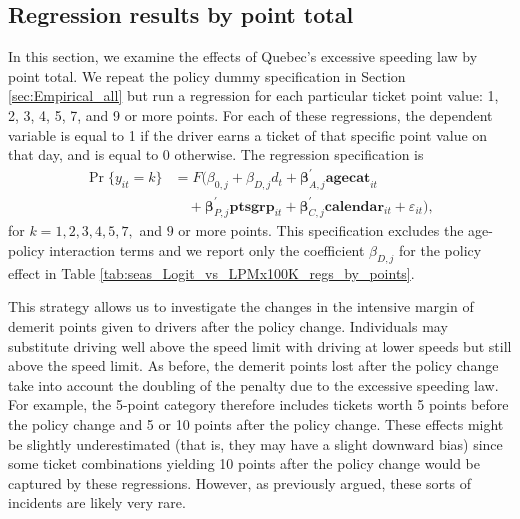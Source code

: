 \subsection{Regression results by point total}
\label{sec:Empirical_by_pts}

In this section, we examine the effects of Quebec’s excessive speeding law by point total. 
We repeat the policy dummy specification in 
Section \ref{sec:Empirical_all} 
but run a regression for each particular ticket point value: 1, 2, 3, 4, 5, 7, and 9 or more points. 
For each of these regressions, the dependent variable is equal to 1 
if the driver earns a ticket of that specific point value on that day, and is equal to 0 otherwise. 
The regression specification is 
%
\begin{align*}
	\Pr\{y_{it} = k\} & 	
	= F( \beta_{0,j} + \beta_{D,j} d_t
	+ \bm{\beta}_{A,j}^{\prime} \bm{agecat}_{it} \\
	&	\quad
	+ \bm{\beta}_{P,j}^{\prime} \bm{ptsgrp}_{it}
	+ \bm{\beta}_{C,j}^{\prime} \bm{calendar}_{it}
	+ \varepsilon_{it} ),
\end{align*}
%
for $k = 1, 2, 3, 4, 5, 7,$ and $9$ or more points. 
This specification excludes the age-policy interaction terms and we report 
only the coefficient $\beta_{D,j}$ for the policy effect
in Table \ref{tab:seas_Logit_vs_LPMx100K_regs_by_points}. 

This strategy allows us to investigate the changes in the intensive margin of 
demerit points given to drivers after the policy change. 
Individuals may substitute driving well above the speed limit with driving at lower speeds 
but still above the speed limit. 
As before, the demerit points lost after the policy change take into account 
the doubling of the penalty due to the excessive speeding law. 
For example, the 5-point category therefore includes tickets 
worth 5 points before the policy change and 5 or 10 points after the policy change. 
These effects might be slightly underestimated (that is, they may have a slight downward bias) 
since some ticket combinations yielding 10 points after the policy change 
would be captured by these regressions. 
However, as previously argued, these sorts of incidents are likely very rare. 





